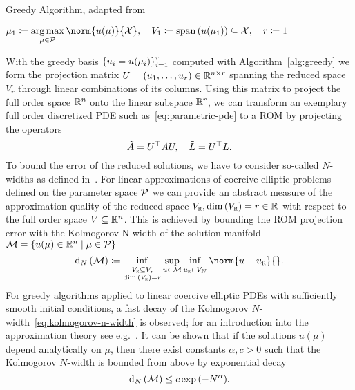 \begin{algorithm}
    \caption{Greedy Algorithm, adapted from~\cite[Algorithm~1]{Buffa2012}}\label{alg:greedy}
    $\mu_1 \coloneqq \argmax\limits_{\mu \in \mcl{P}} \norm{u(\mu)}{\mcl{X}},\quad V_1 \coloneqq \lspn{u(\mu_1)} \subseteq \mcl{X},\quad r \coloneqq 1$\;
\end{algorithm}

With the greedy basis ${\left\{u_i = u(\mu_i)\right\}}_{i = 1}^r$ computed with Algorithm~\ref{alg:greedy} we form the projection matrix $U = \left( u_1, \dots, u_r \right) \in \mathbb{R}^{n \times r}$ spanning the reduced space $V_r$ through linear combinations of its columns.
Using this matrix to project the full order space $\mathbb{R}^n$ onto the linear subspace $\mathbb{R}^r$, we can transform an exemplary full order discretized PDE such as~\eqref{eq:parametric-pde} to a \ac{ROM} by projecting the operators
\begin{equation*}
    \tilde{A} = U^{\top} A U,\quad \tilde{L} = U^{\top} L.
\end{equation*}
To bound the error of the reduced solutions, we have to consider so-called $N$-widths as defined in~\cite{Pinkus1985}.
For linear approximations of coercive elliptic problems defined on the parameter space $\mathcal{P}$ we can provide an abstract measure of the approximation quality of the reduced space $V_{\textnormal{\scshape r}}, \dim{(V_{\textnormal{\scshape r}})} = r \in \mathbb{R}$ with respect to the full order space $V \subseteq \mathbb{R}^n$.
This is achieved by bounding the \ac{ROM} projection error with the Kolmogorov N-width of the solution manifold $\mathcal{M} = \left\{u(\mu) \in \mathbb{R}^n\mid\mu \in \mathcal{P}\right\}$
\begin{equation}\label{eq:kolmogorov-n-width}
    \kolm{\mcl{M}} \coloneqq \eqinf\limits_{\substack{V_\msc{r} \subseteq V,\\\dim{(V_\msc{r})} = r}} \sup\limits_{u \in \mcl{M}} \eqinf\limits_{u_\msc{r} \in V_N} \norm{u - u_\msc{r}}{}.
\end{equation}
For greedy algorithms applied to linear coercive elliptic PDEs with sufficiently smooth initial conditions, a fast decay of the Kolmogorov $N$-width~\eqref{eq:kolmogorov-n-width} is observed; for an introduction into the approximation theory see e.g.~\cite{Binev2011, DeVore2013}.
It can be shown that if the solutions $u(\mu)$ depend analytically on $\mu$, then there exist constants $\alpha, c > 0$ such that the Kolmogorov $N$-width is bounded from above by exponential decay
\begin{equation*}
    \mathop{}\!\mathrm{d}_N\left(\mathcal{M}\right) \leq c \exp{(-N^\alpha)}.
\end{equation*}

